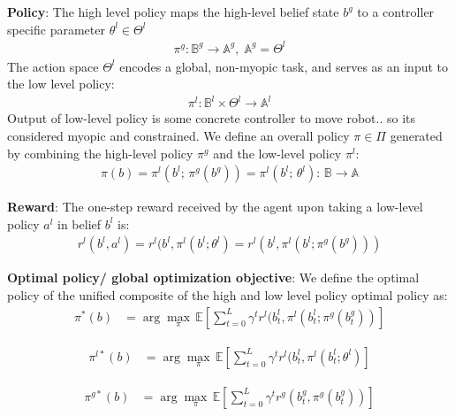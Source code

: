 \documentclass{article}
\newcommand{\ph}[1]{{\textbf{#1}:}} %
\begin{document}
\ph{Policy} The high level policy maps the high-level belief state $b^g$ to a controller specific parameter $\theta^l \in \Theta^l$ 
\begin{align}
    \pi^g : \mathbb{B}^g \to \mathbb{A}^g, \; \mathbb{A}^g = \Theta^l
\end{align}
The action space $\Theta^l$ encodes a global, non-myopic task, and serves as an input to the low level policy: 
\begin{align}
    \pi^l: \mathbb{B}^l \times \Theta^l \to \mathbb{A}^l
\end{align}
Output of low-level policy is some concrete controller to move robot.. so its considered myopic and constrained. We define an overall policy $\pi \in \Pi$ generated by combining the high-level policy $\pi^g$ and the low-level policy $\pi^l$:
\begin{align}
    \pi(b) = \pi^l(b^l; \, \pi^g(b^g)) = \pi^l(b^l; \, \theta^l) : \, \mathbb{B}\rightarrow \mathbb{A} 
\end{align}

\ph{Reward} The one-step reward received by the agent upon taking a low-level policy $a^l$ in belief $b^l$ is:
\begin{align}
    r^l(b^l, a^l) = r^l(b^l, \pi^l(b^l; \theta^l) = r^l(b^l, \pi^l(b^l; \pi^g(b^g)))
\end{align}

\ph{Optimal policy/ global optimization objective} We define the optimal policy of the unified composite of the high and low level policy optimal policy as:
\begin{align}
  \pi^{*}(b) &= \arg\max_\pi \, \mathbb{E} \left[ \sum_{t=0}^{L} \gamma^t r^l(b^l_t, \pi^l(b^l_t; \pi^g(b^g_t)) \right]
  \label{eq:optimal_policy_unified}
\end{align}

\begin{align}
  \pi^{l*}(b) &= \arg\max_\pi \, \mathbb{E} \left[ \sum_{t=0}^{L} \gamma^t r^l(b^l_t, \pi^l(b^l_t; \theta^l) \right]
  \label{eq:optimal_policy_lattice}
\end{align}

\begin{align}
  \pi^{g*}(b) &= \arg\max_\pi \, \mathbb{E} \left[ \sum_{t=0}^{L} \gamma^t r^g(b^g_t, \pi^g(b^g_t)) \right]
  \label{eq:optimal_policy_graph}
\end{align}
\end{document}
